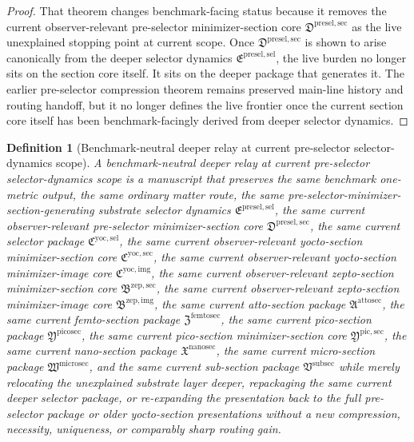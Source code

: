 \documentclass[11pt]{article}
\newcommand{\PreSelectorMinSectionCore}{\mathfrak D^{\mathrm{presel,sec}}}
\newcommand{\PreSectionSelectorPackage}{\mathfrak E^{\mathrm{presel,sel}}}
\newcommand{\YoctoSelectorPackage}{\mathfrak C^{\mathrm{yoc,sel}}}
\newcommand{\YoctoImageCore}{\mathfrak C^{\mathrm{yoc,img}}}
\newcommand{\YoctoMinSectionCore}{\mathfrak C^{\mathrm{yoc,sec}}}
\newcommand{\ZeptoImageCore}{\mathfrak B^{\mathrm{zep,img}}}
\newcommand{\ZeptoMinSectionCore}{\mathfrak B^{\mathrm{zep,sec}}}
\newcommand{\AttoSectionPackage}{\mathfrak A^{\mathrm{attosec}}}
\newcommand{\FemtoSectionPackage}{\mathfrak Z^{\mathrm{femtosec}}}
\newcommand{\PicoSectionPackage}{\mathfrak Y^{\mathrm{picosec}}}
\newcommand{\PicoMinSectionCore}{\mathfrak Y^{\mathrm{pic,sec}}}
\newcommand{\NanoSectionPackage}{\mathfrak X^{\mathrm{nanosec}}}
\newcommand{\MicroSectionPackage}{\mathfrak W^{\mathrm{microsec}}}
\newcommand{\SubSectionPackage}{\mathfrak V^{\mathrm{subsec}}}
\newtheorem{definition}{Definition}
\begin{document}
\begin{proof}
That theorem changes benchmark-facing status because it removes the current observer-relevant pre-selector minimizer-section core \(\PreSelectorMinSectionCore\) as the live unexplained stopping point at current scope. Once \(\PreSelectorMinSectionCore\) is shown to arise canonically from the deeper selector dynamics \(\PreSectionSelectorPackage\), the live burden no longer sits on the section core itself. It sits on the deeper package that generates it. The earlier pre-selector compression theorem remains preserved main-line history and routing handoff, but it no longer defines the live frontier once the current section core itself has been benchmark-facingly derived from deeper selector dynamics.
\end{proof}

\begin{definition}[Benchmark-neutral deeper relay at current pre-selector selector-dynamics scope]
A \emph{benchmark-neutral deeper relay at current pre-selector selector-dynamics scope} is a manuscript that preserves the same benchmark one-metric output, the same ordinary matter route, the same pre-selector-minimizer-section-generating substrate selector dynamics \(\PreSectionSelectorPackage\), the same current observer-relevant pre-selector minimizer-section core \(\PreSelectorMinSectionCore\), the same current selector package \(\YoctoSelectorPackage\), the same current observer-relevant yocto-section minimizer-section core \(\YoctoMinSectionCore\), the same current observer-relevant yocto-section minimizer-image core \(\YoctoImageCore\), the same current observer-relevant zepto-section minimizer-section core \(\ZeptoMinSectionCore\), the same current observer-relevant zepto-section minimizer-image core \(\ZeptoImageCore\), the same current atto-section package \(\AttoSectionPackage\), the same current femto-section package \(\FemtoSectionPackage\), the same current pico-section package \(\PicoSectionPackage\), the same current pico-section minimizer-section core \(\PicoMinSectionCore\), the same current nano-section package \(\NanoSectionPackage\), the same current micro-section package \(\MicroSectionPackage\), and the same current sub-section package \(\SubSectionPackage\) while merely relocating the unexplained substrate layer deeper, repackaging the same current deeper selector package, or re-expanding the presentation back to the full pre-selector package or older yocto-section presentations without a new compression, necessity, uniqueness, or comparably sharp routing gain.
\end{definition}
\end{document}
